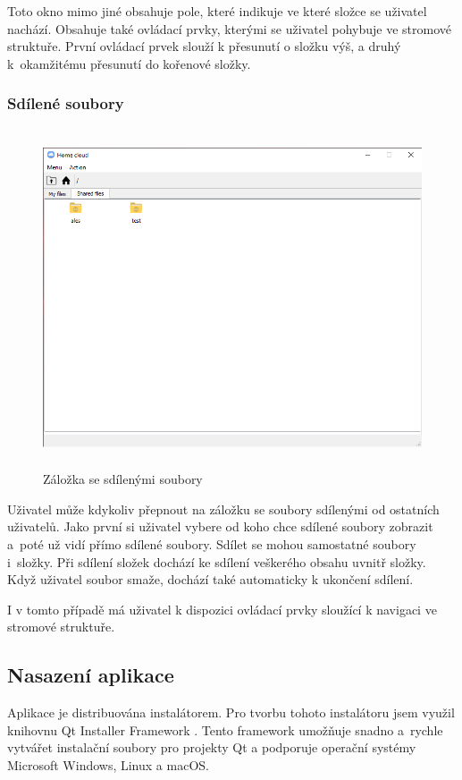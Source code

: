 \documentclass[
  glossaries,
]{kidiplom}
\begin{document}
Toto okno mimo jiné obsahuje pole, které indikuje ve které složce se uživatel nachází. Obsahuje také ovládací prvky, kterými se uživatel pohybuje ve stromové struktuře. První ovládací prvek slouží k přesunutí o složku výš, a druhý k~okamžitému přesunutí do kořenové složky.

\subsubsection{Sdílené soubory}
\begin{figure}[H]
    \centering
    \includegraphics[width=14cm,height=10cm,keepaspectratio]{shared}
    \caption{Záložka se sdílenými soubory}
    \label{fig:shared}
\end{figure}
Uživatel může kdykoliv přepnout na záložku se soubory sdílenými od ostatních uživatelů. Jako první si uživatel vybere od koho chce sdílené soubory zobrazit a~poté už vidí přímo sdílené soubory. Sdílet se mohou samostatné soubory i~složky. Při sdílení složek dochází ke sdílení veškerého obsahu uvnitř složky. Když uživatel soubor smaže, dochází také automaticky k ukončení sdílení.

I v tomto případě má uživatel k dispozici ovládací prvky sloužící k navigaci ve stromové struktuře.

\subsection{Nasazení aplikace}
Aplikace je distribuována instalátorem. Pro tvorbu tohoto instalátoru jsem využil knihovnu Qt Installer Framework \cite{QTINSTALLER}. Tento framework umožňuje snadno a~rychle vytvářet instalační soubory pro projekty Qt a podporuje operační systémy Microsoft Windows, Linux a macOS.
\clearpage
\end{document}
